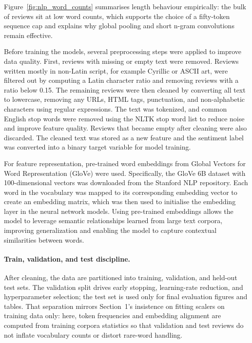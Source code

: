 \documentclass[12pt,a4paper]{article}
\begin{document}
\noindent Figure~\ref{fig:nlp_word_counts} summarises length behaviour empirically: the bulk of reviews sit at low word counts, which supports the choice of a fifty-token sequence cap and explains why global pooling and short n-gram convolutions remain effective.

Before training the models, several preprocessing steps were applied to improve data quality. First, reviews with missing or empty text were removed. Reviews written mostly in non-Latin script, for example Cyrillic or ASCII art, were filtered out by computing a Latin character ratio and removing reviews with a ratio below 0.15. The remaining reviews were then cleaned by converting all text to lowercase, removing any URLs, HTML tags, punctuation, and non-alphabetic characters using regular expressions. The text was tokenized, and common English stop words were removed using the NLTK stop word list to reduce noise and improve feature quality. Reviews that became empty after cleaning were also discarded. The cleaned text was stored as a new feature and the sentiment label was converted into a binary target variable for model training.

For feature representation, pre-trained word embeddings from Global Vectors for Word Representation (GloVe) were used. Specifically, the GloVe 6B dataset with 100-dimensional vectors was downloaded from the Stanford NLP repository. Each word in the vocabulary was mapped to its corresponding embedding vector to create an embedding matrix, which was then used to initialise the embedding layer in the neural network models. Using pre-trained embeddings allows the model to leverage semantic relationships learned from large text corpora, improving generalization and enabling the model to capture contextual similarities between words.

\paragraph{Train, validation, and test discipline.}
After cleaning, the data are partitioned into training, validation, and held-out test sets. The validation split drives early stopping, learning-rate reduction, and hyperparameter selection; the test set is used only for final evaluation figures and tables. That separation mirrors Section~1's insistence on fitting scalers on training data only: here, token frequencies and embedding alignment are computed from training corpora statistics so that validation and test reviews do not inflate vocabulary counts or distort rare-word handling.
\end{document}
